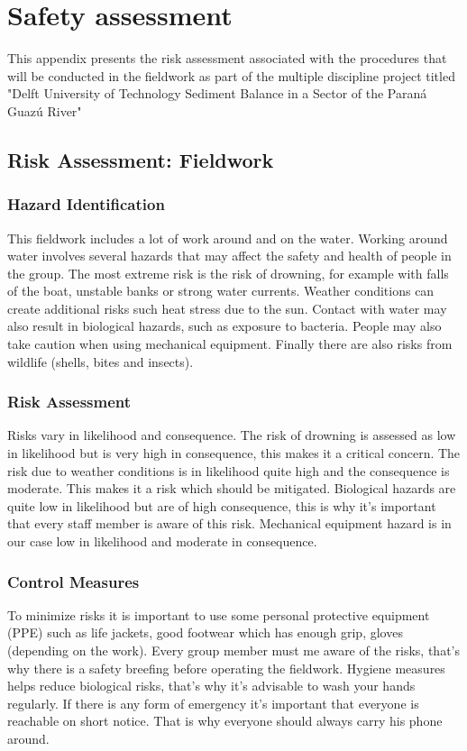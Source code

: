 
\chapter{Safety assessment}

This appendix presents the risk assessment associated with the procedures that will be conducted in the fieldwork as part of the multiple discipline project titled "Delft University of Technology Sediment Balance in a Sector of the Paraná Guazú River"

\section{Risk Assessment: Fieldwork}

\subsection{Hazard Identification}
This fieldwork includes a lot of work around and on the water. Working around water involves several hazards that may affect the safety and health of people in the group. The most extreme risk is the risk of drowning, for example with falls of the boat, unstable banks or strong water currents. Weather conditions can create additional risks such heat stress due to the sun. Contact with water may also result in biological hazards, such as exposure to bacteria. People may also take caution when using mechanical equipment. Finally there are also risks from wildlife (shells, bites and insects). 

\subsection{Risk Assessment}
Risks vary in likelihood and consequence. The risk of drowning is assessed as low in likelihood but is very high in consequence, this makes it a critical concern. The risk due to weather conditions is in likelihood quite high and the consequence is moderate. This makes it a risk which should be mitigated. Biological hazards are quite low in likelihood but are of high consequence, this is why it's important that every staff member is aware of this risk. Mechanical equipment hazard is in our case low in likelihood and moderate in consequence. 


\subsection{Control Measures}
To minimize risks it is important to use some personal protective equipment (PPE) such as life jackets, good footwear which has enough grip, gloves (depending on the work). Every group member must me aware of the risks, that's why there is a safety breefing before operating the fieldwork. Hygiene measures helps reduce biological risks, that's why it's advisable to wash your hands regularly. If there is any form of emergency it's important that everyone is reachable on short notice. That is why everyone should always carry his phone around. 